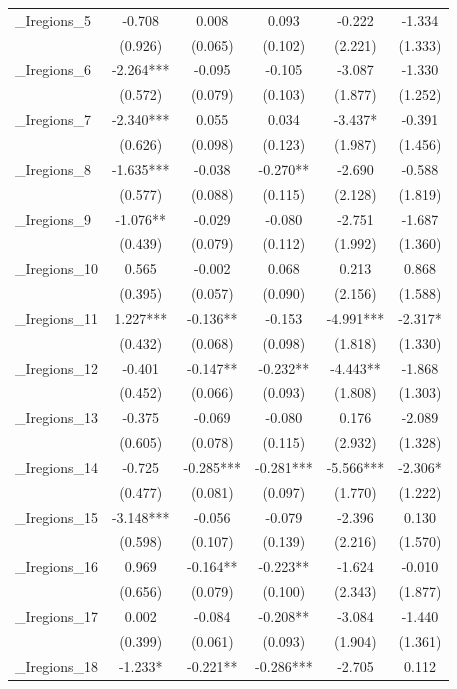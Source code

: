 \documentclass[]{article}
\begin{document}
\begin{tabular}{lccccc}
\_Iregions\_5 & -0.708 & 0.008 & 0.093 & -0.222 & -1.334 \\
 & (0.926) & (0.065) & (0.102) & (2.221) & (1.333) \\
\_Iregions\_6 & -2.264*** & -0.095 & -0.105 & -3.087 & -1.330 \\
 & (0.572) & (0.079) & (0.103) & (1.877) & (1.252) \\
\_Iregions\_7 & -2.340*** & 0.055 & 0.034 & -3.437* & -0.391 \\
 & (0.626) & (0.098) & (0.123) & (1.987) & (1.456) \\
\_Iregions\_8 & -1.635*** & -0.038 & -0.270** & -2.690 & -0.588 \\
 & (0.577) & (0.088) & (0.115) & (2.128) & (1.819) \\
\_Iregions\_9 & -1.076** & -0.029 & -0.080 & -2.751 & -1.687 \\
 & (0.439) & (0.079) & (0.112) & (1.992) & (1.360) \\
\_Iregions\_10 & 0.565 & -0.002 & 0.068 & 0.213 & 0.868 \\
 & (0.395) & (0.057) & (0.090) & (2.156) & (1.588) \\
\_Iregions\_11 & 1.227*** & -0.136** & -0.153 & -4.991*** & -2.317* \\
 & (0.432) & (0.068) & (0.098) & (1.818) & (1.330) \\
\_Iregions\_12 & -0.401 & -0.147** & -0.232** & -4.443** & -1.868 \\
 & (0.452) & (0.066) & (0.093) & (1.808) & (1.303) \\
\_Iregions\_13 & -0.375 & -0.069 & -0.080 & 0.176 & -2.089 \\
 & (0.605) & (0.078) & (0.115) & (2.932) & (1.328) \\
\_Iregions\_14 & -0.725 & -0.285*** & -0.281*** & -5.566*** & -2.306* \\
 & (0.477) & (0.081) & (0.097) & (1.770) & (1.222) \\
\_Iregions\_15 & -3.148*** & -0.056 & -0.079 & -2.396 & 0.130 \\
 & (0.598) & (0.107) & (0.139) & (2.216) & (1.570) \\
\_Iregions\_16 & 0.969 & -0.164** & -0.223** & -1.624 & -0.010 \\
 & (0.656) & (0.079) & (0.100) & (2.343) & (1.877) \\
\_Iregions\_17 & 0.002 & -0.084 & -0.208** & -3.084 & -1.440 \\
 & (0.399) & (0.061) & (0.093) & (1.904) & (1.361) \\
\_Iregions\_18 & -1.233* & -0.221** & -0.286*** & -2.705 & 0.112 \\

\end{tabular}
\end{document}
